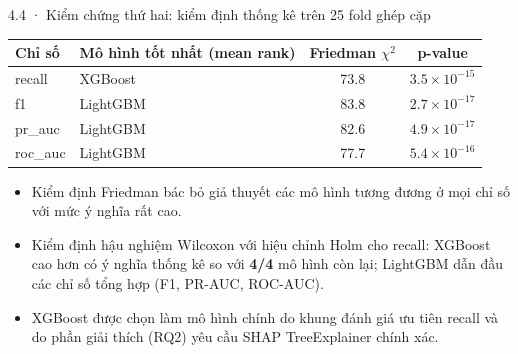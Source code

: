 \documentclass[aspectratio=169,11pt]{beamer}
\begin{document}
\begin{frame}{4.4 · Kiểm chứng thứ hai: kiểm định thống kê trên 25 fold ghép cặp}
\centering\small
\begin{tabular}{@{}llcc@{}}
\toprule
\textbf{Chỉ số} & \textbf{Mô hình tốt nhất (mean rank)} & \textbf{Friedman $\chi^2$} & \textbf{p-value} \\
\midrule
    recall & XGBoost & 73.8 & $3.5\times 10^{-15}$ \\
    f1 & LightGBM & 83.8 & $2.7\times 10^{-17}$ \\
    pr\_auc & LightGBM & 82.6 & $4.9\times 10^{-17}$ \\
    roc\_auc & LightGBM & 77.7 & $5.4\times 10^{-16}$ \\
\bottomrule
\end{tabular}
\vspace{3mm}
\begin{itemize}\small
  \item Kiểm định Friedman bác bỏ giả thuyết các mô hình tương đương ở mọi chỉ số với mức ý nghĩa rất cao.
  \item Kiểm định hậu nghiệm Wilcoxon với hiệu chỉnh Holm cho recall: XGBoost cao hơn có ý nghĩa thống kê so với \textbf{4/4} mô hình còn lại; LightGBM dẫn đầu các chỉ số tổng hợp (F1, PR-AUC, ROC-AUC).
  \item XGBoost được chọn làm mô hình chính do khung đánh giá ưu tiên recall và do phần giải thích (RQ2) yêu cầu SHAP TreeExplainer chính xác.
\end{itemize}
\end{frame}
\end{document}
